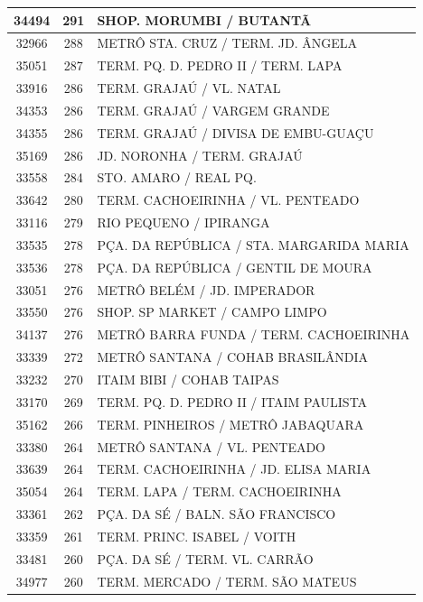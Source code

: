 \documentclass[
	12pt,				%
	oneside,			%
	a4paper,			%
	english,			%
	brazil				%
	]{abntex2ppgsi}
\begin{document}
\begin{apendicesenv}
\begin{longtable}{c|c|p{7cm}}
\hline
    34494 & 291   & SHOP. MORUMBI / BUTANTÃ \\
\hline
    32966 & 288   & METRÔ STA. CRUZ / TERM. JD. ÂNGELA \\
\hline
    35051 & 287   & TERM. PQ. D. PEDRO II / TERM. LAPA \\
\hline
    33916 & 286   & TERM. GRAJAÚ / VL. NATAL \\
\hline
    34353 & 286   & TERM. GRAJAÚ / VARGEM GRANDE \\
\hline
    34355 & 286   & TERM. GRAJAÚ / DIVISA DE EMBU-GUAÇU \\
\hline
    35169 & 286   & JD. NORONHA / TERM. GRAJAÚ \\
\hline
    33558 & 284   & STO. AMARO / REAL PQ. \\
\hline
    33642 & 280   & TERM. CACHOEIRINHA / VL. PENTEADO \\
\hline
    33116 & 279   & RIO PEQUENO / IPIRANGA \\
\hline
    33535 & 278   & PÇA. DA REPÚBLICA / STA. MARGARIDA MARIA \\
\hline
    33536 & 278   & PÇA. DA REPÚBLICA / GENTIL DE MOURA \\
\hline
    33051 & 276   & METRÔ BELÉM / JD. IMPERADOR \\
\hline
    33550 & 276   & SHOP. SP MARKET / CAMPO LIMPO \\
\hline
    34137 & 276   & METRÔ BARRA FUNDA / TERM. CACHOEIRINHA \\
\hline
    33339 & 272   & METRÔ SANTANA / COHAB BRASILÂNDIA \\
\hline
    33232 & 270   & ITAIM BIBI / COHAB TAIPAS \\
\hline
    33170 & 269   & TERM. PQ. D. PEDRO II / ITAIM PAULISTA \\
\hline
    35162 & 266   & TERM. PINHEIROS / METRÔ JABAQUARA \\
\hline
    33380 & 264   & METRÔ SANTANA / VL. PENTEADO \\
\hline
    33639 & 264   & TERM. CACHOEIRINHA / JD. ELISA MARIA \\
\hline
    35054 & 264   & TERM. LAPA / TERM. CACHOEIRINHA \\
\hline
    33361 & 262   & PÇA. DA SÉ / BALN. SÃO FRANCISCO \\
\hline
    33359 & 261   & TERM. PRINC. ISABEL / VOITH \\
\hline
    33481 & 260   & PÇA. DA SÉ / TERM. VL. CARRÃO \\
\hline
    34977 & 260   & TERM. MERCADO / TERM. SÃO MATEUS \\

\end{longtable}
\end{apendicesenv}
\end{document}
